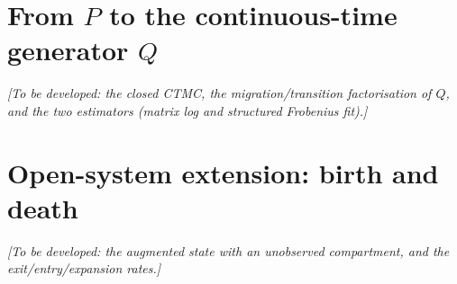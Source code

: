 \documentclass[11pt]{article}
\begin{document}
\section{From \texorpdfstring{$P$}{P} to the continuous-time generator \texorpdfstring{$Q$}{Q}}
\label{sec:ctmc}
\emph{[To be developed: the closed CTMC, the migration/transition factorisation
of $Q$, and the two estimators (matrix log and structured Frobenius fit).]}

\section{Open-system extension: birth and death}
\label{sec:open}
\emph{[To be developed: the augmented state with an unobserved compartment, and
the exit/entry/expansion rates.]}
\end{document}
